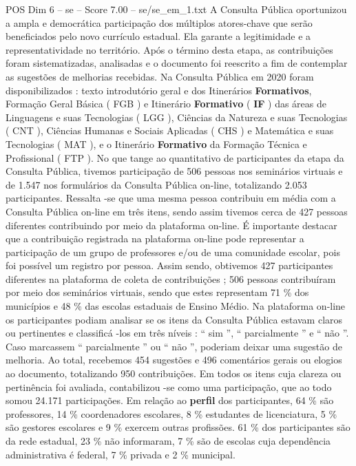 \begin{textsample}{POS Dim 6 – se – Score 7.00 – se/se\_em\_1.txt}
A Consulta Pública oportunizou a ampla e democrática participação dos múltiplos atores-chave que serão beneficiados pelo novo currículo estadual.
Ela garante a legitimidade e a representatividade no território.
Após o término desta etapa, as contribuições foram sistematizadas, analisadas e o documento foi reescrito a fim de contemplar as sugestões de melhorias recebidas.
Na Consulta Pública em 2020 foram disponibilizados : texto introdutório geral e dos Itinerários \textbf{Formativos}, Formação Geral Básica ( FGB ) e Itinerário \textbf{Formativo} ( \textbf{IF} ) das áreas de Linguagens e suas Tecnologias ( LGG ), Ciências da Natureza e suas Tecnologias ( CNT ), Ciências Humanas e Sociais Aplicadas ( CHS ) e Matemática e suas Tecnologias ( MAT ), e o Itinerário \textbf{Formativo} da Formação Técnica e Profissional ( FTP ).
No que tange ao quantitativo de participantes da etapa da Consulta Pública, tivemos participação de 506 pessoas nos seminários virtuais e de 1.547 nos formulários da Consulta Pública on-line, totalizando 2.053 participantes.
Ressalta -se que uma mesma pessoa contribuiu em média com a Consulta Pública on-line em três itens, sendo assim tivemos cerca de 427 pessoas diferentes contribuindo por meio da plataforma on-line.
É importante destacar que a contribuição registrada na plataforma on-line pode representar a participação de um grupo de professores e/ou de uma comunidade escolar, pois foi possível um registro por pessoa.
Assim sendo, obtivemos 427 participantes diferentes na plataforma de coleta de contribuições ; 506 pessoas contribuíram por meio dos seminários virtuais, sendo que estes representam 71 \% dos municípios e 48 \% das escolas estaduais de Ensino Médio.
Na plataforma on-line os participantes podiam analisar se os itens da Consulta Pública estavam claros ou pertinentes e classificá -los em três níveis : “ sim ”, “ parcialmente ” e “ não ”.
Caso marcassem “ parcialmente ” ou “ não ”, poderiam deixar uma sugestão de melhoria.
Ao total, recebemos 454 sugestões e 496 comentários gerais ou elogios ao documento, totalizando 950 contribuições.
Em todos os itens cuja clareza ou pertinência foi avaliada, contabilizou -se como uma participação, que ao todo somou 24.171 participações.
Em relação ao \textbf{perfil} dos participantes, 64 \% são professores, 14 \% coordenadores escolares, 8 \% estudantes de licenciatura, 5 \% são gestores escolares e 9 \% exercem outras profissões. 61 \% dos participantes são da rede estadual, 23 \% não informaram, 7 \% são de escolas cuja dependência administrativa é federal, 7 \% privada e 2 \% municipal.

\end{textsample}
